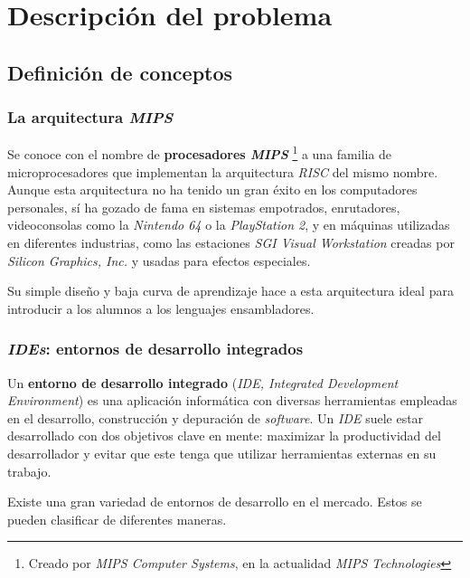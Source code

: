 \chapter{Descripción del problema} \label{ch:descripcion-del-problema}


\section{Definición de conceptos}\label{sec:definicion-de-conceptos}

\subsection{La arquitectura \textit{MIPS}}\label{subsec:la-arquitectura-mips}

Se conoce con el nombre de \textbf{procesadores \textit{MIPS}}
\footnote{Creado por \emph{MIPS Computer Systems}, en la actualidad \emph{MIPS Technologies}}
a una familia de microprocesadores que implementan
la arquitectura \textit{RISC} del mismo nombre.
Aunque esta arquitectura no ha tenido un gran éxito en los computadores personales, sí ha gozado de fama en
sistemas empotrados, enrutadores, videoconsolas como la \textit{Nintendo 64} o la \textit{PlayStation 2},
y en máquinas utilizadas en diferentes industrias, como las estaciones \textit{SGI Visual Workstation}
creadas por \textit{Silicon Graphics, Inc.} y usadas para efectos especiales.

Su simple diseño y baja curva de aprendizaje hace a esta arquitectura ideal para introducir a los alumnos
a los lenguajes ensambladores.

\subsection{\textit{IDEs}: entornos de desarrollo integrados}\label{subsec:ides-entornos-de-desarrollo-integrados}

Un \textbf{entorno de desarrollo integrado} (\textit{IDE, Integrated Development Environment}) es una aplicación
informática con diversas herramientas empleadas en el desarrollo, construcción y depuración de \textit{software}.
Un \textit{IDE} suele estar desarrollado con dos objetivos clave en mente: maximizar la productividad del
desarrollador y evitar que este tenga que utilizar herramientas externas en su trabajo.

Existe una gran variedad de entornos de desarrollo en el mercado.
Estos se pueden clasificar de diferentes maneras.

